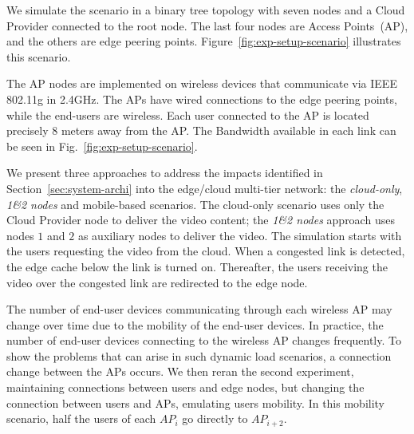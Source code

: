 

We simulate the scenario in a binary tree topology with seven nodes and a Cloud Provider connected to the root node. The last four nodes are Access Points~(AP), and the others are edge peering points. Figure~\ref{fig:exp-setup-scenario} illustrates this scenario.

The AP nodes are implemented on wireless devices that communicate via IEEE 802.11g in 2.4GHz. The APs have wired connections to the edge peering points, while the end-users are wireless. Each user connected to the AP is located precisely 8 meters away from the AP. The Bandwidth available in each link can be seen in Fig.~\ref{fig:exp-setup-scenario}.

We present three approaches to address the impacts identified in Section~\ref{sec:system-archi} into the edge/cloud multi-tier network: the \textit{cloud-only}, \textit{1\&2 nodes} and mobile-based scenarios. The cloud-only scenario uses only the Cloud Provider node to deliver the video content; the \textit{1\&2 nodes} approach uses nodes $1$ and $2$ as auxiliary nodes to deliver the video. The simulation starts with the users requesting the video from the cloud. When a congested link is detected, the edge cache below the link is turned on. Thereafter, the users receiving the video over the congested link are redirected to the edge node. 

The number of end-user devices communicating through each wireless AP may change over time due to the mobility of the end-user devices. In practice, the number of end-user devices connecting to the wireless AP changes frequently. 
To show the problems that can arise in such dynamic load scenarios, a connection change between the APs occurs. We then reran the second experiment, maintaining connections between users and edge nodes, but changing the connection between users and APs, emulating users mobility. In this mobility scenario, half the users of each $AP_{i}$ go directly to $AP_{i + 2}$.


